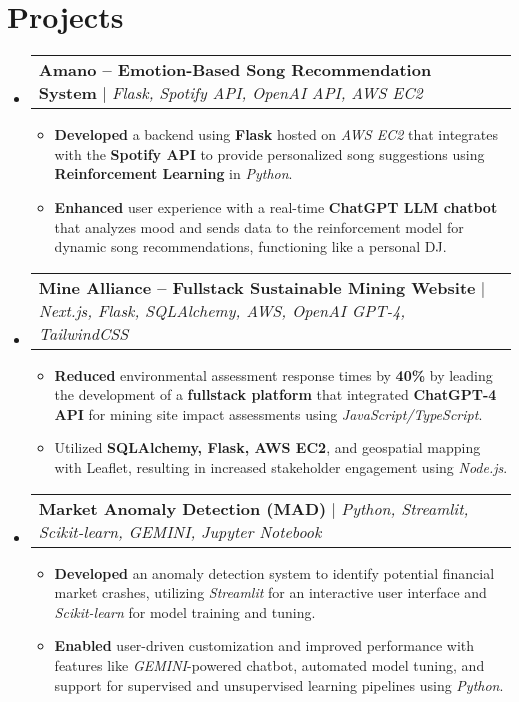 \documentclass[letterpaper,10pt]{article}
\makeatletter
\newcommand{\resumeItem}[1]{
  \item\small{
    {#1 \vspace{-2pt}}
  }
}
\newcommand{\resumeProjectHeading}[2]{
    \item
    \begin{tabular*}{0.97\textwidth}{l@{\extracolsep{\fill}}r}
      \small#1 & #2 \\
    \end{tabular*}\vspace{-4pt}
}
\newcommand{\resumeSubHeadingListStart}{\begin{itemize}[leftmargin=0.1in, label={}]}
\newcommand{\resumeSubHeadingListEnd}{\end{itemize}}
\newcommand{\resumeItemListStart}{\begin{itemize}}
\newcommand{\resumeItemListEnd}{\end{itemize}\vspace{-6pt}}
\makeatother
\begin{document}
\section{Projects}
    \vspace{-4pt}
    \resumeSubHeadingListStart
      \resumeProjectHeading
          {\textbf{Amano – Emotion-Based Song Recommendation System} $|$ \emph{Flask, Spotify API, OpenAI API, AWS EC2}}{}
      \vspace{-4pt}
          \resumeItemListStart
            \resumeItem{\textbf{Developed} a backend using \textbf{Flask} hosted on \emph{AWS EC2} that integrates with the \textbf{Spotify API} to provide personalized song suggestions using \textbf{Reinforcement Learning} in \emph{Python}.}
            \resumeItem{\textbf{Enhanced} user experience with a real-time \textbf{ChatGPT LLM chatbot} that analyzes mood and sends data to the reinforcement model for dynamic song recommendations, functioning like a personal DJ.}
          \resumeItemListEnd

      \resumeProjectHeading
          {\textbf{Mine Alliance – Fullstack Sustainable Mining Website} $|$ \emph{Next.js, Flask, SQLAlchemy, AWS, OpenAI GPT-4, TailwindCSS}}{}
      \vspace{-4pt}
          \resumeItemListStart
            \resumeItem{\textbf{Reduced} environmental assessment response times by \textbf{40\%} by leading the development of a \textbf{fullstack platform} that integrated \textbf{ChatGPT-4 API} for mining site impact assessments using \emph{JavaScript/TypeScript}.}
            \resumeItem{Utilized \textbf{SQLAlchemy, Flask, AWS EC2}, and geospatial mapping with Leaflet, resulting in increased stakeholder engagement using \emph{Node.js}.}
          \resumeItemListEnd

      \resumeProjectHeading
          {\textbf{Market Anomaly Detection (MAD)} $|$ \emph{Python, Streamlit, Scikit-learn, GEMINI, Jupyter Notebook}}{}
      \vspace{-4pt}
          \resumeItemListStart
            \resumeItem{\textbf{Developed} an anomaly detection system to identify potential financial market crashes, utilizing \emph{Streamlit} for an interactive user interface and \emph{Scikit-learn} for model training and tuning.}
            \resumeItem{\textbf{Enabled} user-driven customization and improved performance with features like \emph{GEMINI}-powered chatbot, automated model tuning, and support for supervised and unsupervised learning pipelines using \emph{Python}.}
          \resumeItemListEnd
    \resumeSubHeadingListEnd
\end{document}
